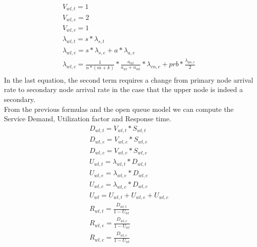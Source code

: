 \documentclass[11pt]{article}
\begin{document}
\begin{equation}
    \begin{array}{l}
        V_{wl, t} = 1 \\
        V_{wl, e} = 2 \\ %
        V_{wl,c} = 1 \\
        \lambda_{wl, t} = s*\lambda_{s, t} \\
        \lambda_{wl, e} = s*\lambda_{s, e} + a*\lambda_{a, e} \\
        \lambda_{wl, c} = \frac{1}{n*(m+k)} * \frac{a_{wl}}{a_{wl}+a_{mt}} * \lambda_{cn, c} + prb * \frac{\lambda_{pn, e}}{2}  \\\
    \end{array}
\end{equation}
In the last equation, the second term requires a change from primary node arrival rate to secondary node arrival rate in the case that the upper node is indeed a secondary.\\
From the previous formulas and the open queue model we can compute the Service Demand, Utilization factor and Response time.
\begin{equation}
    \begin{array}{l}
        D_{wl, t} = V_{wl, t} * S_{wl, t} \\
        D_{wl, e} = V_{wl, e} * S_{wl, e} \\
        D_{wl, c} = V_{wl, c} * S_{wl, c} \\
        U_{wl, t} = \lambda_{wl, t} * D_{wl, t} \\
        U_{wl, e} = \lambda_{wl, e} * D_{wl, e} \\
        U_{wl, c} = \lambda_{wl, c} * D_{wl, c} \\
        U_{wl} = U_{wl, t} + U_{wl, e} + U_{wl, c} \\
        R_{wl, t} = \frac{D_{wl, t}}{1 - U_{wl}} \\
        R_{wl, e} = \frac{D_{wl, e}}{1 - U_{wl}} \\
        R_{wl, c} = \frac{D_{wl, c}}{1 - U_{wl}} \\
    \end{array}
\end{equation}
\end{document}
